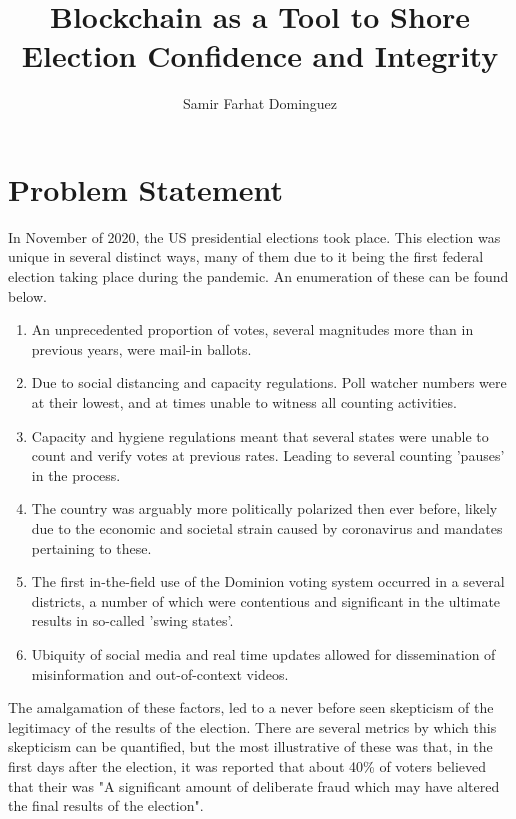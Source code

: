 \documentclass{article}
\title{Blockchain as a Tool to Shore Election Confidence and Integrity}
\author{Samir Farhat Dominguez}
\begin{document}
\maketitle


\section{Problem Statement}
In November of 2020, the US presidential elections took place. This election was unique in several distinct ways, many of them due to it being the first federal election taking place during the pandemic. An enumeration of these can be found below.
\begin{enumerate}
    \item An unprecedented proportion of votes, several magnitudes more than in previous years, were mail-in ballots.
    \item Due to social distancing and capacity regulations. Poll watcher numbers were at their lowest, and at times unable to witness all counting activities.
    \item Capacity and hygiene regulations meant that several states were unable to count and verify votes at previous rates. Leading to several counting 'pauses' in the process. 
    \item The country was arguably more politically polarized then ever before, likely due to the economic and societal strain caused by coronavirus and mandates pertaining to these.
    \item The first in-the-field use of the Dominion voting system occurred in a several districts, a number of which were contentious and significant in the ultimate results in so-called 'swing states'.
    \item Ubiquity of social media and real time updates allowed for dissemination of misinformation and out-of-context videos.
\end{enumerate}
The amalgamation of these factors, led to a never before seen skepticism of the legitimacy of the results of the election. There are several metrics by which this skepticism can be quantified, but the most illustrative of these was that, in the first days after the election, it was reported that about 40\% of voters believed that their was "A significant amount of deliberate fraud which may have altered the final results of the election".\cite{ferrara2020}
\end{document}
